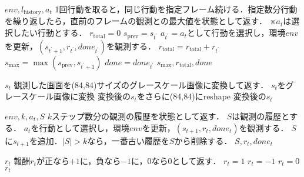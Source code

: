 \documentclass{jarticle}
\begin{document}
\begin{algorithm}[tb]
\caption{$step_{\mathrm{repeat}}(a_t)$}
\label{alg:max_and_skip}                          
\begin{algorithmic}[1]   
\REQUIRE $env, l_{\mathrm{history}}, a_t$
\STATE 1回行動を取ると，同じ行動を指定フレーム続ける．指定数分行動を繰り返したら，直前のフレームの観測との最大値を状態として返す．
\STATE ※$a_t$は選択したい行動とする．
\STATE $r_{\mathrm{total}}=0$
\STATE $s_{\mathrm{prev}}=s_{t^{\prime}}$
\STATE $a_{t^{\prime}}=a_t$として行動を選択し，環境$env$を更新，$(s_{t^{\prime}+1},r_{t^{\prime}}, done_{t^{\prime}})$を観測する．
\STATE $r_{\mathrm{total}}=r_{\mathrm{total}}+r_{t^{\prime}}$
\STATE $s_{\mathrm{max}}=\max(s_{\mathrm{prev}}, s_{t^{\prime}+1})$
\STATE $done=done_{t^{\prime}}$
\ENDFOR
\ENSURE $s_{\mathrm{max}}, r_{\mathrm{total}}, done$
\end{algorithmic}
\end{algorithm}

\begin{algorithm}[tb]
\caption{$observe_{\mathrm{gray84}}()$}
\label{alg:process_frame84}                          
\begin{algorithmic}[1]   
\REQUIRE $s_t$
\STATE 観測した画面を(84,84)サイズのグレースケール画像に変換して返す．
\STATE $s_t$をグレースケール画像に変換
\STATE 変換後の$s_t$をさらに(84,84)にreshape
\ENSURE 変換後の$s_t$
\end{algorithmic}
\end{algorithm}

\begin{algorithm}[tb]
\caption{$step_{\mathrm{stack}}(a_t)$}
\label{alg:frame_stack}                          
\begin{algorithmic}[1]   
\REQUIRE $env, k, a_t, S$
\STATE $k$ステップ数分の観測の履歴を状態として返す．
\STATE $S$は観測の履歴とする．
\STATE $a_t$を行動として選択し，環境$env$を更新，$(s_{t+1},r_t, done_t)$を観測する．
\STATE $S$に$s_{t+1}$を追加．$|S|>k$なら，一番古い履歴を$S$から削除する．
\ENSURE $S, r_t, done_t$
\end{algorithmic}
\end{algorithm}

\begin{algorithm}[tb]
\caption{$reward_{\mathrm{clip}}()$}
\label{alg:clipped_reward_wrapper}                          
\begin{algorithmic}[1]   
\REQUIRE $r_t$
\STATE 報酬$r_t$が正なら$+1$に，負なら$-1$に，$0$なら$0$として返す．
\STATE $r_t=1$
\STATE $r_t=-1$
\ELSE
\STATE $r_t=0$
\ENDIF
\ENSURE $r_t$
\end{algorithmic}
\end{algorithm}
\end{document}
